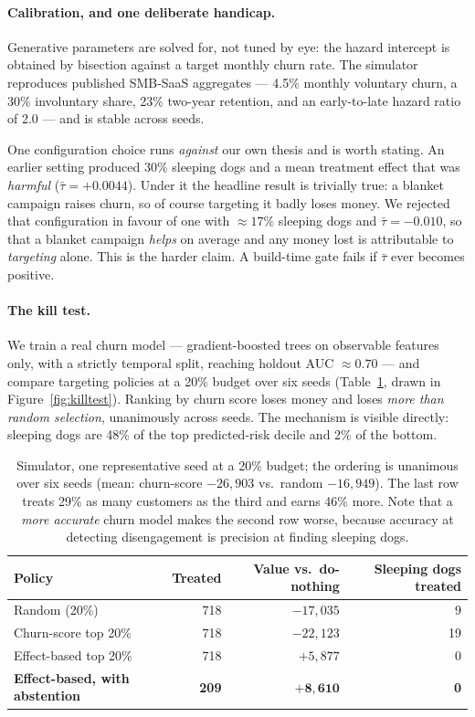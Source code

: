 \documentclass[11pt,a4paper]{article}
\newcommand{\CATE}{\tau}
\begin{document}
\paragraph{Calibration, and one deliberate handicap.} Generative parameters are
solved for, not tuned by eye: the hazard intercept is obtained by bisection against
a target monthly churn rate. The simulator reproduces published SMB-SaaS aggregates
--- 4.5\% monthly voluntary churn, a 30\% involuntary share, 23\% two-year
retention, and an early-to-late hazard ratio of 2.0 --- and is stable across seeds.

One configuration choice runs \emph{against} our own thesis and is worth stating.
An earlier setting produced 30\% sleeping dogs and a mean treatment effect that was
\emph{harmful} ($\bar\CATE = +0.0044$). Under it the headline result is trivially
true: a blanket campaign raises churn, so of course targeting it badly loses money.
We rejected that configuration in favour of one with $\approx17\%$ sleeping dogs and
$\bar\CATE = -0.010$, so that a blanket campaign \emph{helps} on average and any
money lost is attributable to \emph{targeting} alone. This is the harder claim. A
build-time gate fails if $\bar\CATE$ ever becomes positive.

\paragraph{The kill test.} We train a real churn model --- gradient-boosted trees on
observable features only, with a strictly temporal split, reaching holdout
AUC $\approx 0.70$ --- and compare targeting policies at a 20\% budget over six
seeds (Table~\ref{tab:killtest}, drawn in Figure~\ref{fig:killtest}). Ranking by
churn score loses money and loses
\emph{more than random selection}, unanimously across seeds. The mechanism is
visible directly: sleeping dogs are 48\% of the top predicted-risk decile and 2\% of
the bottom.

\begin{table}[t]
\centering
\begin{tabular}{lrrr}
\toprule
Policy & Treated & Value vs.\ do-nothing & Sleeping dogs treated \\
\midrule
Random (20\%)                & 718 & $-17{,}035$ & 9 \\
Churn-score top 20\%         & 718 & $-22{,}123$ & 19 \\
Effect-based top 20\%        & 718 & $+5{,}877$  & 0 \\
\textbf{Effect-based, with abstention} & \textbf{209} & $\mathbf{+8{,}610}$ & \textbf{0} \\
\bottomrule
\end{tabular}
\caption{Simulator, one representative seed at a 20\% budget; the ordering is
unanimous over six seeds (mean: churn-score $-26{,}903$ vs.\ random $-16{,}949$).
The last row treats 29\% as many customers as the third and earns 46\% more. Note
that a \emph{more accurate} churn model makes the second row worse, because accuracy
at detecting disengagement is precision at finding sleeping dogs.}
\label{tab:killtest}
\end{table}
\end{document}
